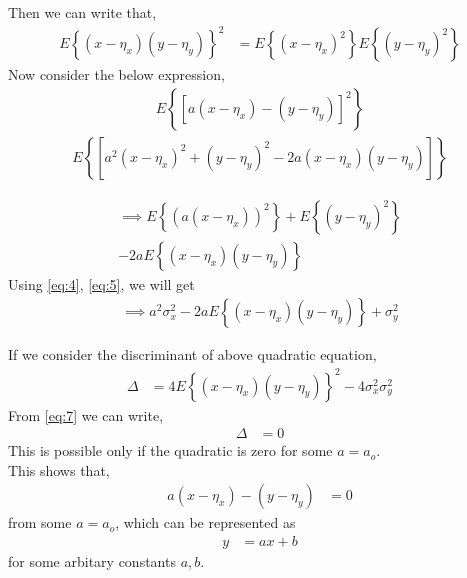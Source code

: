\documentclass{beamer}
\providecommand{\sbrak}[1]{\ensuremath{{}\left[#1\right]}}
\providecommand{\brak}[1]{\ensuremath{\left(#1\right)}}
\providecommand{\cbrak}[1]{\ensuremath{\left\{#1\right\}}}
\begin{document}
\begin{frame}
Then we can write that,
      \begin{align}
             E\cbrak{\brak{x - \eta_{x}}\brak{y-\eta_{y}}}^{2} &= E\cbrak{\brak{x-\eta_{x}}^{2}} E\cbrak{\brak{y-\eta_{y}}^{2}}\label{eq:7}
      \end{align}
 Now consider the below expression,
      \begin{align}
            E\cbrak{\sbrak{a\brak{x-\eta_{x}} - \brak{y-\eta_{y}}}^{2}}
      \end{align}
      \begin{equation}
       \begin{split}
           E\cbrak{\sbrak{a^{2}\brak{x-\eta_{x}}^{2} +   \brak{y-\eta_{y}}^{2} -2a\brak{x-\eta_{x}}\brak{y-\eta_{y}}}}
       \end{split}
      \end{equation}

       \begin{equation}
         \begin{split}
        \implies  E\cbrak{\brak{a\brak{x-\eta_{x}}}^{2}} +  E\cbrak{\brak{y-\eta_{y}}^{2}}\\ -2aE\cbrak{\brak{x-\eta_{x}}\brak{y-\eta_{y}}}
       \end{split}
      \end{equation}
   Using \eqref{eq:4}, \eqref{eq:5}, we will get
       \begin{align}
         \implies a^{2} \sigma_{x}^{2}  -2aE\cbrak{\brak{x-\eta_{x}}\brak{y-\eta_{y}}}+ \sigma_{y}^{2}
       \end{align}
\end{frame}

\begin{frame}
 If we consider the discriminant of above quadratic equation,
      \begin{align}
              \Delta &= 4 E\cbrak{\brak{x - \eta_{x}}\brak{y-\eta_{y}}}^{2} - 4\sigma_{x}^{2} \sigma_{y}^{2}
      \end{align}
    From \eqref{eq:7} we can write,
        \begin{align}
              \Delta &= 0
        \end{align}
 This is possible only if the quadratic is zero for some $ a = a_{o} $.\\ This shows that,
        \begin{align}
            a\brak{x-\eta_{x}} - \brak{y-\eta_{y}} &= 0
         \end{align}
   from some $ a = a_{o}$, which can be represented as 
       \begin{align}
         y  &= ax +b
       \end{align}
     for some arbitary constants $a,b$.  

\end{frame}
\end{document}
